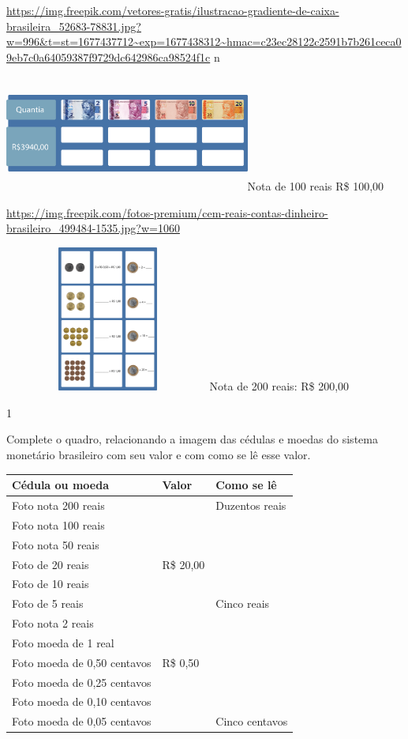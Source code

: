 \begin{escolha}
{\url{https://img.freepik.com/vetores-gratis/ilustracao-gradiente-de-caixa-brasileira_52683-78831.jpg?w=996\&t=st=1677437712~exp=1677438312~hmac=c23ec28122c2591b7b261ceca09eb7c0a64059387f9729dc642986ca98524f1c}
n

\includegraphics[width=3.18285in,height=1.50833in]{media/image70.png}Nota
de 100 reais R\$ 100,00

\url{https://img.freepik.com/fotos-premium/cem-reais-contas-dinheiro-brasileiro_499484-1535.jpg?w=1060}

\includegraphics[width=2.68333in,height=1.88913in]{media/image71.png}Nota
de 200 reais: R\$ 200,00


\num{1}

Complete o quadro, relacionando a imagem das cédulas e moedas do
sistema monetário brasileiro com seu valor e com como se lê esse valor.


\begin{longtable}[]{@{}lll@{}}
\toprule
Cédula ou moeda & Valor & Como se lê\tabularnewline
\midrule
\endhead
Foto nota 200 reais & & Duzentos reais\tabularnewline
Foto nota 100 reais & &\tabularnewline
Foto nota 50 reais & &\tabularnewline
Foto de 20 reais & R\$ 20,00 &\tabularnewline
Foto de 10 reais & &\tabularnewline
Foto de 5 reais & & Cinco reais\tabularnewline
Foto nota 2 reais & &\tabularnewline
Foto moeda de 1 real & &\tabularnewline
Foto moeda de 0,50 centavos & R\$ 0,50 &\tabularnewline
Foto moeda de 0,25 centavos & &\tabularnewline
Foto moeda de 0,10 centavos & &\tabularnewline
Foto moeda de 0,05 centavos & & Cinco centavos\tabularnewline
\bottomrule
\end{longtable}

}
\end{escolha}
